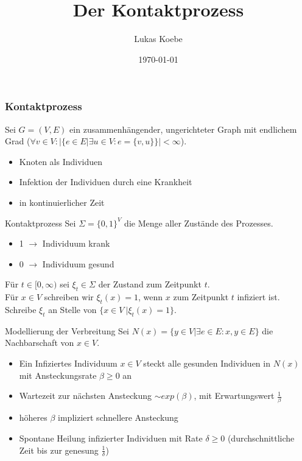 \documentclass[11pt]{beamer}
\title{Der Kontaktprozess}
\author{Lukas Koebe}
\institute{Technische Universit\"at M\"unchen}
\date{\today}
\begin{document}
\begin{frame}
\titlepage
\end{frame}

\begin{frame}
\frametitle{Kontaktprozess}
Sei $G = (V, E)$ ein zusammenhängender, ungerichteter Graph mit endlichem Grad
($\forall v \in V : |\{ e \in E | \exists u \in V : e = \{v, u\} \}| < \infty$).
\begin{itemize}
    \item Knoten als Individuen
    \item Infektion der Individuen durch eine Krankheit
    \item in kontinuierlicher Zeit
\end{itemize}
\end{frame}


\begin{frame}{Kontaktprozess}
Sei $\Sigma = \{ 0, 1 \}^V$ die Menge aller Zustände des Prozesses.
\begin{itemize}
    \item 1 $\to$ Individuum krank
    \item 0 $\to$ Individuum gesund
\end{itemize}
Für $t \in [0, \infty)$ sei $\xi_t \in \Sigma$ der Zustand zum Zeitpunkt $t$.
\\
Für $x \in V$ schreiben wir $\xi_t(x) = 1$, wenn $x$ zum Zeitpunkt $t$ infiziert ist.
\\
\vspace{1cm}
Schreibe $\xi_t$ an Stelle von $\{x \in V\ | \xi_t(x) = 1 \}$.
\end{frame}

\begin{frame}{Modellierung der Verbreitung}
    Sei $N(x) = \{ y \in V | \exists e \in E : {x, y} \in E \}$ die Nachbarschaft von $x \in V$.
    \begin{itemize}
        \item<2-> 
            Ein Infiziertes Individuum $x \in V$ steckt alle gesunden Individuen in $N(x)$
            mit Ansteckungsrate $\beta \geq 0$ an
        \item<3->
            Wartezeit zur n\"achsten Ansteckung $\sim exp(\beta)$, mit Erwartungswert $\frac{1}{\beta}$
        \item<4->
            höheres $\beta$ impliziert schnellere Ansteckung
        \item<5-> 
            Spontane Heilung infizierter Individuen
            mit Rate $\delta \geq 0$ (durchschnittliche Zeit bis zur genesung $\frac{1}{\delta}$)
    \end{itemize}
\end{frame}
\end{document}
